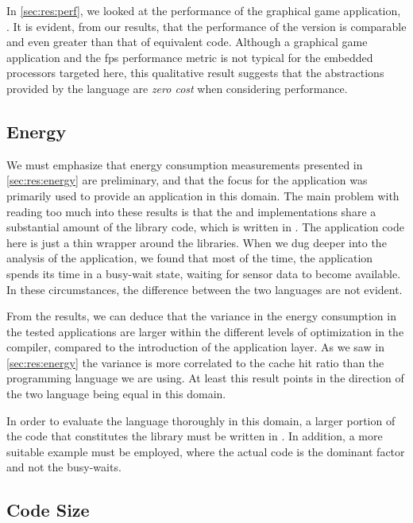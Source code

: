 In \autoref{sec:res:perf}, we looked at the performance of the graphical game application, {\cg}.
It is evident, from our results, that the performance of the {\rust} version is comparable and even greater than that of equivalent {\C} code.
Although a graphical game application and the \gls{fps} performance metric is not typical for the embedded processors targeted here, this qualitative result suggests that the abstractions provided by the {\rust} language are \emph{zero cost} when considering performance.

\subsection{Energy}

We must emphasize that energy consumption measurements presented in \autoref{sec:res:energy} are preliminary, and that the focus for the {\tracker} application was primarily used to provide an application in this domain.
The main problem with reading too much into these results is that the {\rust} and {\C} implementations share a substantial amount of the library code, which is written in {\C}.
The application code here is just a thin wrapper around the libraries.
When we dug deeper into the analysis of the application, we found that most of the time, the application spends its time in a busy-wait state, waiting for sensor data to become available.
In these circumstances, the difference between the two languages are not evident.

From the results, we can deduce that the variance in the energy consumption in the tested applications are larger within the different levels of optimization in the {\C} compiler, compared to the introduction of the {\rust} application layer.
As we saw in \autoref{sec:res:energy} the variance is more correlated to the cache hit ratio than the programming language we are using.
At least this result points in the direction of the two language being equal in this domain.

In order to evaluate the {\rust} language thoroughly in this domain, a larger portion of the code that constitutes the library must be written in {\rust}.
In addition, a more suitable example must be employed, where the actual code is the dominant factor and not the busy-waits.

\subsection{Code Size}

